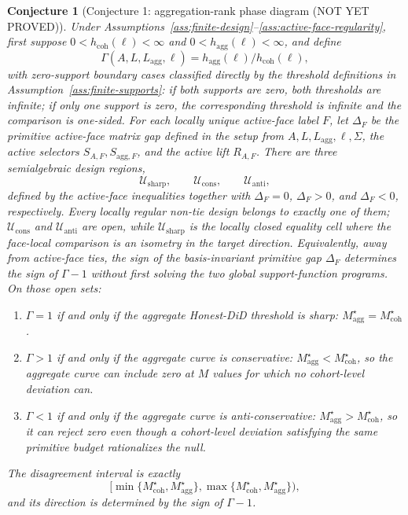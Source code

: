 \documentclass[11pt]{article}
\theoremstyle{definition}
\theoremstyle{plain}
\newtheorem{conjecture}{Conjecture}
\theoremstyle{remark}
\begin{document}
\begin{conjecture}[Conjecture 1: aggregation-rank phase diagram (NOT YET PROVED)]\label{conj:rank-phase}
Under Assumptions~\ref{ass:finite-design}--\ref{ass:active-face-regularity}, first suppose \(0<h_{\mathrm{coh}}(\ell)<\infty\) and \(0<h_{\mathrm{agg}}(\ell)<\infty\), and define
\[
\Gamma(A,L,L_{\mathrm{agg}},\ell)
=h_{\mathrm{agg}}(\ell)/h_{\mathrm{coh}}(\ell),
\]
with zero-support boundary cases classified directly by the threshold definitions in Assumption~\ref{ass:finite-supports}: if both supports are zero, both thresholds are infinite; if only one support is zero, the corresponding threshold is infinite and the comparison is one-sided.
For each locally unique active-face label \(F\), let \(\Delta_F\) be the primitive active-face matrix gap defined in the setup from \(A,L,L_{\mathrm{agg}},\ell,\Sigma\), the active selectors \(S_{A,F},S_{\mathrm{agg},F}\), and the active lift \(R_{A,F}\).
There are three semialgebraic design regions,
\[
  \mathcal U_{\mathrm{sharp}},\qquad
  \mathcal U_{\mathrm{cons}},\qquad
  \mathcal U_{\mathrm{anti}},
\]
defined by the active-face inequalities together with \(\Delta_F=0\), \(\Delta_F>0\), and \(\Delta_F<0\), respectively.
Every locally regular non-tie design belongs to exactly one of them; \(\mathcal U_{\mathrm{cons}}\) and \(\mathcal U_{\mathrm{anti}}\) are open, while \(\mathcal U_{\mathrm{sharp}}\) is the locally closed equality cell where the face-local comparison is an isometry in the target direction.
Equivalently, away from active-face ties, the sign of the basis-invariant primitive gap \(\Delta_F\) determines the sign of \(\Gamma-1\) without first solving the two global support-function programs.
On those open sets:
\begin{enumerate}[label=(\roman*)]
\item \(\Gamma=1\) if and only if the aggregate Honest-DiD threshold is sharp: \(M_{\mathrm{agg}}^\star=M_{\mathrm{coh}}^\star\).
\item \(\Gamma>1\) if and only if the aggregate curve is conservative: \(M_{\mathrm{agg}}^\star<M_{\mathrm{coh}}^\star\), so the aggregate curve can include zero at \(M\) values for which no cohort-level deviation can.
\item \(\Gamma<1\) if and only if the aggregate curve is anti-conservative: \(M_{\mathrm{agg}}^\star>M_{\mathrm{coh}}^\star\), so it can reject zero even though a cohort-level deviation satisfying the same primitive budget rationalizes the null.
\end{enumerate}
The disagreement interval is exactly
\[
[\min\{M_{\mathrm{coh}}^\star,M_{\mathrm{agg}}^\star\},
  \max\{M_{\mathrm{coh}}^\star,M_{\mathrm{agg}}^\star\}),
\]
and its direction is determined by the sign of \(\Gamma-1\).
\end{conjecture}
\end{document}
